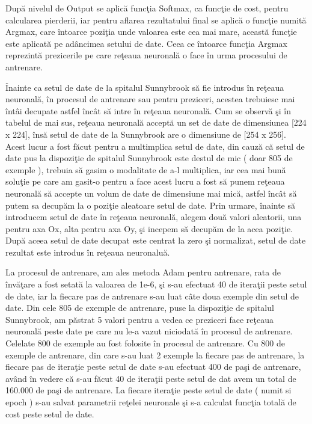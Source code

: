 \par

Dup\u{a} nivelul de Output se aplic\u{a} func\c{t}ia Softmax, ca func\c{t}ie de cost, pentru calcularea pierderii, iar pentru aflarea rezultatului final se aplic\u{a} o func\c{t}ie numit\u{a} Argmax, care \^{i}ntoarce pozi\c{t}ia unde valoarea este cea mai mare, aceast\u{a} func\c{t}ie este aplicat\u{a} pe ad\^{a}ncimea setului de date. Ceea ce \^{i}ntoarce func\c{t}ia Argmax reprezint\u{a} prezicerile pe care re\c{t}eaua neuronal\u{a} o face \^{i}n urma procesului de antrenare.

\par

\^{I}nainte ca setul de date de la spitalul Sunnybrook s\u{a} fie introdus \^{i}n re\c{t}eaua neuronal\u{a}, \^{i}n procesul de antrenare sau pentru preziceri, acestea trebuiesc mai \^{i}nt\^{a}i decupate astfel \^{i}nc\^{a}t s\u{a} intre \^{i}n re\c{t}eaua neuronal\u{a}. Cum se observ\u{a} \c{s}i \^{i}n tabelul de mai sus, re\c{t}eaua neuronal\u{a} accept\u{a} un set de date de dimensiunea [224 x 224], \^{i}ns\u{a} setul de date de la Sunnybrook are o dimensiune de [254 x 256]. Acest lucur a fost f\u{a}cut pentru a multimplica setul de date, din cauz\u{a} c\u{a} setul de date pus la dispozi\c{t}ie de spitalul Sunnybrook este destul de mic ( doar 805 de exemple ), trebuia s\u{a} gasim o modalitate de a-l multiplica, iar cea mai bun\u{a} solu\c{t}ie pe care am gasit-o pentru a face acest lucru a fost s\u{a} punem re\c{t}eaua neuronal\u{a} s\u{a} accepte un volum de date de dimensiune mai mic\u{a}, astfel \^{i}nc\^{a}t s\u{a} putem sa decup\u{a}m la o pozi\c{t}ie aleatoare setul de date. Prin urmare, \^{i}nainte s\u{a} introducem setul de date \^{i}n re\c{t}eaua neuronal\u{a}, alegem dou\u{a} valori aleatorii, una pentru axa Ox, alta pentru axa Oy, \c{s}i incepem s\u{a} decup\u{a}m de la acea pozi\c{t}ie. Dup\u{a} aceea setul de date  decupat este centrat la zero \c{s}i normalizat, setul de date rezultat este introdus \^{i}n re\c{t}eaua neuronalu\u{a}.

\par

La procesul de antrenare,  am ales metoda Adam pentru antrenare, rata de \^{i}nv\u{a}\c{t}are a fost setat\u{a} la valoarea de 1e-6, \c{s}i s-au efectuat 40 de itera\c{t}ii peste setul de date, iar la fiecare pas de antrenare s-au luat c\^{a}te doua exemple din setul de date. Din cele 805 de exemple de antrenare, puse la dispozi\c{t}ie de spitalul Sunnybrook, am p\u{a}strat 5 valori pentru a vedea ce preziceri face re\c{t}eaua neuronal\u{a} peste date pe care nu le-a vazut niciodat\u{a} \^{i}n procesul de antrenare. Celelate 800 de exemple au fost folosite \^{i}n procesul de antrenare. Cu 800 de exemple de antrenare, din care s-au luat 2 exemple la fiecare pas de antrenare, la fiecare pas de itera\c{t}ie peste setul de date s-au efectuat 400 de pa\c{s}i de antrenare, av\^{a}nd \^{i}n vedere c\u{a} s-au f\u{a}cut 40 de itera\c{t}ii peste setul de dat avem un total de 160.000 de pa\c{s}i de antrenare. La fiecare itera\c{t}ie peste setul de date ( numit si epoch ) s-au salvat parametrii re\c{t}elei neuronale \c{s}i s-a calculat func\c{t}ia total\u{a} de cost peste setul de date.

